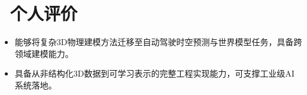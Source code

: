 \documentclass[11pt]{article}
\begin{document}
\section{\makebox[\widthof{\faUser}][c]{\color{CVBlue}\faUser}\ 个人评价}


\begin{itemize}
    \item 能够将复杂3D物理建模方法迁移至自动驾驶时空预测与世界模型任务，具备跨领域建模能力。
    \item 具备从非结构化3D数据到可学习表示的完整工程实现能力，可支撑工业级AI系统落地。
\end{itemize}
\end{document}
